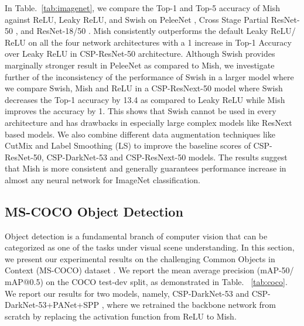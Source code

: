 \documentclass{bmvc2k}
\begin{document}
In Table.~\ref{tab:imagenet}, we compare the Top-1 and Top-5 accuracy of Mish against ReLU, Leaky ReLU, and Swish on PeleeNet \cite{wang2018pelee} , Cross Stage Partial ResNet-50 \cite{wang2019cspnet}, and ResNet-18/50 \cite{he2016deep}. Mish consistently outperforms the default Leaky ReLU/ ReLU on all the four network architectures with a 1 increase in Top-1 Accuracy over Leaky ReLU in CSP-ResNet-50 architecture. Although Swish provides marginally stronger result in PeleeNet as compared to Mish, we investigate further of the inconsistency of the performance of Swish in a larger model where we compare Swish, Mish and ReLU in a CSP-ResNext-50 model \cite{wang2019cspnet, xie2017aggregated} where Swish decreases the Top-1 accuracy by 13.4 as compared to Leaky ReLU while Mish improves the accuracy by 1. This shows that Swish cannot be used in every architecture and has drawbacks in especially large complex models like ResNext based models. We also combine different data augmentation techniques like CutMix \cite{yun2019cutmix} and Label Smoothing (LS) \cite{muller2019does} to improve the baseline scores of CSP-ResNet-50, CSP-DarkNet-53 \cite{bochkovskiy2020yolov4} and CSP-ResNext-50 models. The results suggest that Mish is more consistent and generally guarantees performance increase in almost any neural network for ImageNet classification. 


\subsection{MS-COCO Object Detection}

Object detection \cite{girshick2014rich} is a fundamental branch of computer vision that can be categorized as one of the tasks under visual scene understanding. In this section, we present our experimental results on the challenging Common Objects in Context (MS-COCO) dataset \cite{lin2014microsoft}. We report the mean average precision (mAP-50/ mAP@0.5) on the COCO test-dev split, as demonstrated in Table. ~\ref{tab:coco}. We report our results for two models, namely, CSP-DarkNet-53 \cite{bochkovskiy2020yolov4} and CSP-DarkNet-53+PANet+SPP \cite{bochkovskiy2020yolov4, he2015spatial}, where we retrained the backbone network from scratch by replacing the activation function from ReLU to Mish. 
\end{document}
